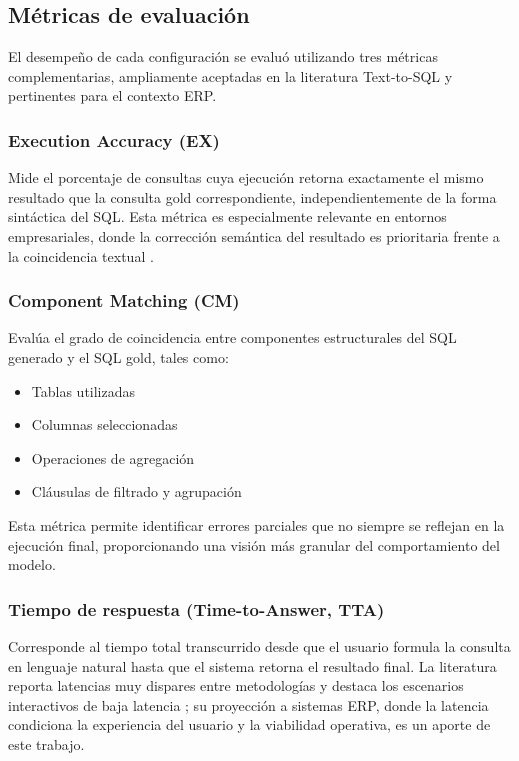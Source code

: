 \documentclass[journal]{IEEEtran}
\begin{document}
\subsection{Métricas de evaluación}

El desempeño de cada configuración se evaluó utilizando tres métricas complementarias, ampliamente aceptadas en la literatura Text-to-SQL y pertinentes para el contexto ERP.

\subsubsection{Execution Accuracy (EX)}

Mide el porcentaje de consultas cuya ejecución retorna exactamente el mismo resultado que la consulta gold correspondiente, independientemente de la forma sintáctica del SQL. Esta métrica es especialmente relevante en entornos empresariales, donde la corrección semántica del resultado es prioritaria frente a la coincidencia textual \cite{scholak2021picard, hong2024bird}.

\subsubsection{Component Matching (CM)}

Evalúa el grado de coincidencia entre componentes estructurales del SQL generado y el SQL gold, tales como:

\begin{itemize}
	\item Tablas utilizadas
	\item Columnas seleccionadas
	\item Operaciones de agregación
	\item Cláusulas de filtrado y agrupación
\end{itemize}

Esta métrica permite identificar errores parciales que no siempre se reflejan en la ejecución final, proporcionando una visión más granular del comportamiento del modelo.

\subsubsection{Tiempo de respuesta (Time-to-Answer, TTA)}

Corresponde al tiempo total transcurrido desde que el usuario formula la consulta en lenguaje natural hasta que el sistema retorna el resultado final. La literatura reporta latencias muy dispares entre metodologías y destaca los escenarios interactivos de baja latencia \cite{liu2025survey}; su proyección a sistemas ERP, donde la latencia condiciona la experiencia del usuario y la viabilidad operativa, es un aporte de este trabajo.
\end{document}

